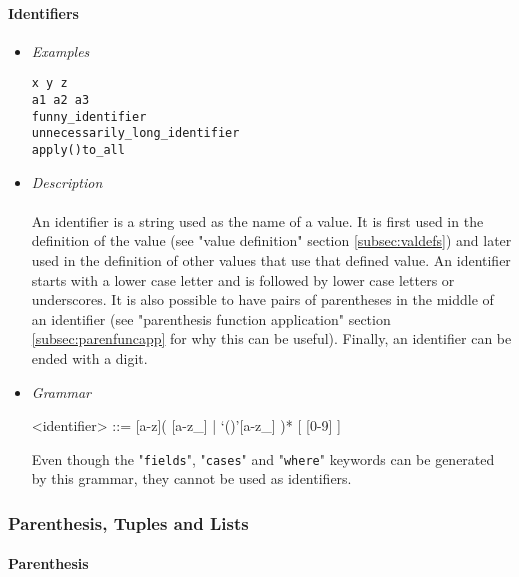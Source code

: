 \documentclass{article}
\begin{document}
\paragraph{Identifiers}
\begin{itemize}

\item \textit{Examples}
\begin{verbatim}
x y z
a1 a2 a3 
funny_identifier 
unnecessarily_long_identifier
apply()to_all
\end{verbatim}

\item \textit{Description} \\\\
An identifier is a string used as the name of a value. It is first used in the
definition of the value (see "value definition" section \ref{subsec:valdefs})
and later used in the definition of other values that use that defined value.
An identifier starts with a lower case letter and is followed by lower case
letters or underscores. It is also possible to have pairs of parentheses in the
middle of an identifier (see "parenthesis function application" section
\ref{subsec:parenfuncapp} for why this can be useful). Finally, an identifier
can be ended with a digit.

\item \textit{Grammar}
\begin{grammar}
<identifier> ::= [a-z]( [a-z_] | `()'[a-z_] )* [ [0-9] ]
\end{grammar}
Even though the "\texttt{fields}", "\texttt{cases}" and "\texttt{where}"
keywords can be generated by this grammar, they cannot be used as identifiers.

\end{itemize}

\newpage
\subsubsection{Parenthesis, Tuples and Lists}

\paragraph{Parenthesis}
\end{document}
